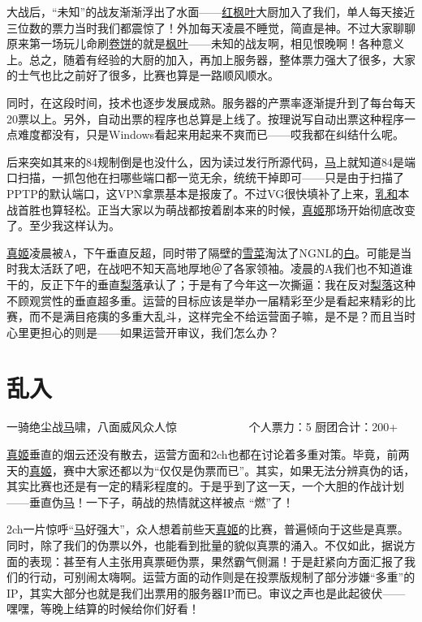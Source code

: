 大战后，“未知”的战友渐渐浮出了水面——\uline{红枫叶}大厨加入了我们，单人每天接近三位数的票力当时我们都震惊了！外加每天凌晨不睡觉，简直是神。不过大家聊聊原来第一场玩儿命刷\uline{卷饼}的就是\uline{枫叶}——未知的战友啊，相见恨晚啊！各种意义上。总之，随着有经验的大厨的加入，再加上服务器，整体票力强大了很多，大家的士气也比之前好了很多，比赛也算是一路顺风顺水。

同时，在这段时间，技术也逐步发展成熟。服务器的产票率逐渐提升到了每台每天20票以上。另外，自动出票的程序也总算是上线了。按理说写自动出票这种程序一点难度都没有，只是Windows看起来用起来不爽而已——哎我都在纠结什么呢。

后来突如其来的84规制倒是也没什么，因为读过发行所源代码，\uline{马}上就知道84是端口扫描，一抓包他在扫哪些端口都一览无余，统统干掉即可——只是由于扫描了PPTP的默认端口，这VPN拿票基本是报废了。不过VG很快填补了上来，\uline{乳和}本战首胜也算轻松。正当大家以为萌战都按着剧本来的时候，\uline{真姬}那场开始彻底改变了。至少我这样认为。

\uline{真姬}凌晨被A，下午垂直反超，同时带了隔壁的\uline{雪菜}淘汰了NGNL的\uline{白}。可能是当时我太活跃了吧，在战吧不知天高地厚地＠了各家领袖。凌晨的A我们也不知道谁干的，反正下午的垂直\uline{梨落}承认了；于是有了今年这一次撕逼：我在反对\uline{梨落}这种不顾观赏性的垂直超多重。运营的目标应该是举办一届精彩至少是看起来精彩的比赛，而不是满目疮痍的多重大乱斗，这样完全不给运营面子嘛，是不是？而且当时心里更担心的则是——如果运营开审议，我们怎么办？

\chapter{乱入}
\begin{center}
{\subTitle 一骑绝尘战\uline{马}啸，八面威风众人惊}
\subMemo
　　　　　　个人票力：5 厨团合计：200+
\end{center}

\uline{真姬}垂直的烟云还没有散去，运营方面和2ch也都在讨论着多重对策。毕竟，前两天的\uline{真姬}，赛中大家还都以为“仅仅是伪票而已”。其实，如果无法分辨真伪的话，其实比赛也还是有一定的精彩程度的。于是乎到了这一天，一个大胆的作战计划——垂直伪\uline{马}！一下子，萌战的热情就这样被点 “燃”了！

2ch一片惊呼“\uline{马}好强大”，众人想着前些天\uline{真姬}的比赛，普遍倾向于这些是真票。同时，除了我们的伪票以外，也能看到批量的貌似真票的涌入。不仅如此，据说方面的表现：甚至有人主张用真票砸伪票，果然霸气侧漏！于是赶紧向方面汇报了我们的行动，可别闹太嗨啊。运营方面的动作则是在投票版规制了部分涉嫌“多重”的IP，其实大部分也就是我们出票用的服务器IP而已。审议之声也是此起彼伏——嘿嘿，等晚上结算的时候给你们好看！

